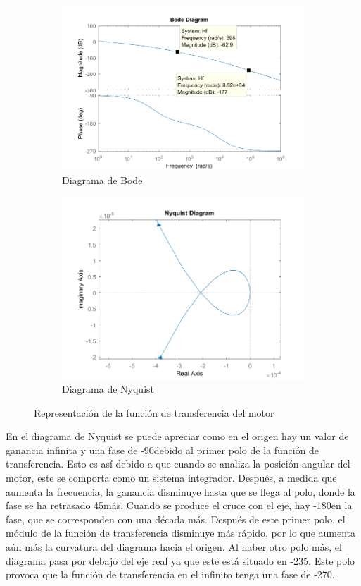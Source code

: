 \documentclass[a4paper]{article}
\begin{document}
\begin{center}
	\begin{figure}[htp]
		\begin{subfigure}{1\textwidth}
			\centering
			\includegraphics[width=12cm]{bode}
			\caption{Diagrama de Bode}
		\end{subfigure}
		
		\begin{subfigure}{1\textwidth}
			\centering
			\includegraphics[width=12cm]{nyquist}
			\caption{Diagrama de Nyquist}
		\end{subfigure}
		\caption{Representación de la función de transferencia del motor}
		\label{bode}
	\end{figure}
\end{center}


En el diagrama de Nyquist se puede apreciar como en el origen hay un valor de ganancia infinita y una fase de -90\degree debido al primer polo de la función de transferencia. Esto es así debido a que cuando se analiza la posición angular del motor, este se comporta como un sistema integrador. Después, a medida que aumenta la frecuencia, la ganancia disminuye hasta que se llega al polo, donde la fase se ha retrasado 45\degree más. Cuando se produce el cruce con el eje, hay -180\degree en la fase, que se corresponden con una década más. Después de este primer polo, el módulo de la función de transferencia disminuye más rápido, por lo que aumenta aún más la curvatura del diagrama hacia el origen. Al haber otro polo más, el diagrama pasa por debajo del eje real ya que este está situado en -235\degree. Este polo provoca que la función de transferencia en el infinito tenga una fase de -270\degree.
\end{document}

